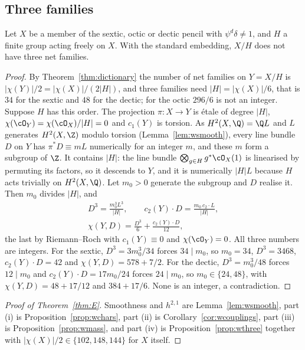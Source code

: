 \subsection{Three families}

\begin{proposition}\label{prop:wthree}
Let $X$ be a member of the sextic, octic or dectic pencil with
$\psi^d\delta\ne1$, and $H$ a finite group acting freely on $X$. With the
standard embedding, $X/H$ does not have three net families.
\end{proposition}

\begin{proof}
By Theorem~\ref{thm:dictionary} the number of net families on $Y=X/H$ is
$|\chi(Y)|/2=|\chi(X)|/(2|H|)$, and three families need
$|H|=|\chi(X)|/6$, that is $34$ for the sextic and $48$ for the dectic; for
the octic $296/6$ is not an integer. Suppose $H$ has this order. The
projection $\pi\colon X\to Y$ is \'etale of degree $|H|$, $\chi(\cO_Y)=
\chi(\cO_X)/|H|=0$ and $c_1(Y)$ is torsion. As $H^2(X,\Q)=\Q L$ and $L$
generates $H^2(X,\Z)$ modulo torsion (Lemma~\ref{lem:wsmooth}), every line
bundle $D$ on $Y$ has $\pi^*D\equiv mL$ numerically for an integer $m$, and
these $m$ form a subgroup of $\Z$. It contains $|H|$: the line bundle
$\bigotimes_{g\in H}g^*\cO_X(1)$ is linearised by permuting its factors, so
it descends to $Y$, and it is numerically $|H|L$ because $H$ acts trivially
on $H^2(X,\Q)$. Let $m_0>0$ generate the subgroup and $D$ realise it. Then
$m_0$ divides $|H|$, and
\[
\begin{gathered}
D^3=\frac{m_0^3L^3}{|H|},\qquad c_2(Y)\cdot D=\frac{m_0\,c_2\cdot L}{|H|},\\
\chi(Y,D)=\frac{D^3}{6}+\frac{c_2(Y)\cdot D}{12},
\end{gathered}
\]
the last by Riemann--Roch with $c_1(Y)\equiv0$ and $\chi(\cO_Y)=0$. All
three numbers are integers. For the sextic, $D^3=3m_0^3/34$ forces
$34\mid m_0$, so $m_0=34$, $D^3=3468$, $c_2(Y)\cdot D=42$ and
$\chi(Y,D)=578+7/2$. For the dectic, $D^3=m_0^3/48$ forces $12\mid m_0$ and
$c_2(Y)\cdot D=17m_0/24$ forces $24\mid m_0$, so $m_0\in\{24,48\}$, with
$\chi(Y,D)=48+17/12$ and $384+17/6$. None is an integer, a contradiction.
\end{proof}

\begin{proof}[Proof of Theorem~\ref{thm:E}]
Smoothness and $h^{2,1}$ are Lemma~\ref{lem:wsmooth}, part (i) is
Proposition~\ref{prop:wchars}, part (ii) is
Corollary~\ref{cor:wcouplings}, part (iii) is Proposition~\ref{prop:wmass},
and part (iv) is Proposition~\ref{prop:wthree} together with
$|\chi(X)|/2\in\{102,148,144\}$ for $X$ itself.
\end{proof}

